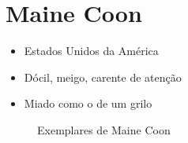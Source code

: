 \documentclass[a4paper]{article}
\begin{document}
  \section{Maine Coon}

  \begin{itemize}
    \item Estados Unidos da Am\'erica
    \item D\'ocil, meigo, carente de aten\c{c}\~ao
    \item Miado como o de um grilo
  \end{itemize}

  \begin{figure}[ht]
    \centering

      

    \caption{Exemplares de Maine Coon}
    \label{fig:maine-coon}
  \end{figure}
\end{document}

